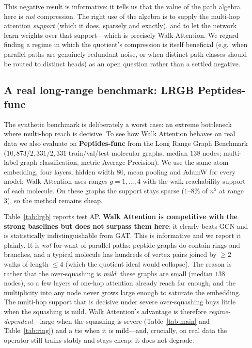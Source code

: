 This negative result is informative: it tells us that the value of the path
algebra here is \emph{not} compression. The right use of the algebra is to supply
the multi-hop attention \emph{support} (which it does, sparsely and exactly), and
to let the network learn weights over that support---which is precisely Walk
Attention. We regard finding a regime in which the quotient's compression is
itself beneficial (e.g.\ when parallel paths are genuinely redundant noise, or
when distinct path classes should be routed to distinct heads) as an open
question rather than a settled negative.

\subsection{A real long-range benchmark: LRGB Peptides-func}

The synthetic benchmark is deliberately a worst case: an extreme bottleneck where
multi-hop reach is decisive. To see how Walk Attention behaves on real data we
also evaluate on \textbf{Peptides-func} from the Long Range Graph Benchmark
\cite{dwivedi2022lrgb} ($10{,}873/2{,}331/2{,}331$ train/val/test molecular
graphs, median $138$ nodes; multi-label graph classification, metric Average
Precision). We use the same atom embedding, four layers, hidden width $80$, mean
pooling and AdamW for every model; Walk Attention uses ranges $g=1,\dots,4$ with
the walk-reachability support of each molecule. On these graphs the support stays
sparse ($1$--$8\%$ of $n^2$ at range $3$), so the method remains cheap.

Table~\ref{tab:lrgb} reports test AP. \textbf{Walk Attention is competitive with
the strong baselines but does not surpass them here}: it clearly beats GCN and is
statistically indistinguishable from GAT. This is informative and we report it
plainly. It is \emph{not} for want of parallel paths: peptide graphs do contain
rings and branches, and a typical molecule has hundreds of vertex pairs joined by
$\ge 2$ walks of length $\le 4$ (which the quotient ideal would collapse). The
reason is rather that the over-squashing is \emph{mild}: these graphs are small
(median $138$ nodes), so a few layers of one-hop attention already reach far
enough, and the multiplicity into any node never grows large enough to saturate
the embedding. The multi-hop support that is decisive under severe over-squashing
buys little when the squashing is mild. Walk Attention's advantage is therefore
\emph{regime-dependent}---large when the squashing is severe (Table~\ref{tab:main}
and Table~\ref{tab:ring}) and a tie when it is mild---and, crucially, on real data
the operator still trains stably and stays cheap; it does not degrade.

